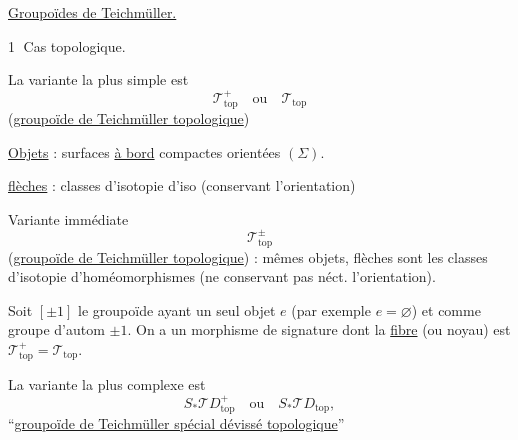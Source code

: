 \uline{Groupoïdes de Teichmüller.}

\textcircled{1} Cas topologique.

La variante la plus simple est
\[
\mathcal T^+_{\mathrm{top}}\quad\text{ou}\quad\mathcal T_{\mathrm{top}}
\]
(\uline{groupoïde de Teichmüller  topologique})

\uline{Objets} : surfaces \uline{à bord} compactes orientées $(\Sigma)$.

\uline{flèches} : classes d'isotopie d'iso (conservant l'orientation)


Variante immédiate
\[
\mathcal T_{\mathrm{top}}^\pm
\]
(\uline{groupoïde de Teichmüller  topologique}) :
mêmes objets, flèches sont les classes d'isotopie d'homéomorphismes
(ne conservant pas néct. l'orientation).

Soit $[\pm1]$ le groupoïde ayant un seul objet $e$ (par exemple $e=\varnothing$)
et comme groupe d'autom $\pm1$. On a un morphisme de signature
dont la \uline{fibre}  (ou noyau) est
$\mathcal T_{\mathrm{top}}^+=\mathcal T_{\mathrm{top}}$.

La variante la plus complexe est
\[
S_*\mathcal TD_{\mathrm{top}}^+\quad\text{ou}\quad
S_*\mathcal TD_{\mathrm{top}},
\]
``\uline{groupoïde de Teichmüller  spécial dévissé topologique}''
